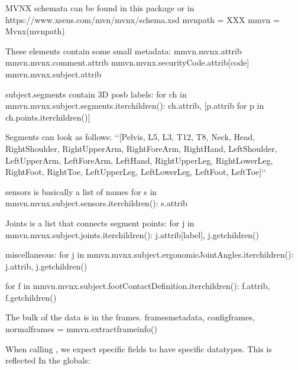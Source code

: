 \documentclass[letterpaper,10pt,english,openany,oneside]{sphinxmanual}
\begin{document}
\begin{sphinxVerbatim}[commandchars=\\\{\}]
\PYGZsh{} MVNX schemata can be found in this package or in
\PYGZsh{} https://www.xsens.com/mvn/mvnx/schema.xsd
mvn\PYGZus{}path = \PYGZdq{}XXX\PYGZdq{}
mmvn = Mvnx(mvn\PYGZus{}path)

\PYGZsh{} These elements contain some small metadata:
mmvn.mvnx.attrib
mmvn.mvnx.comment.attrib
mmvn.mvnx.securityCode.attrib[\PYGZdq{}code\PYGZdq{}]
mmvn.mvnx.subject.attrib

\PYGZsh{} subject.segments contain 3D pos\PYGZus{}b labels:
for ch in mmvn.mvnx.subject.segments.iterchildren():
    ch.attrib, [p.attrib for p in ch.points.iterchildren()]

\PYGZsh{} Segments can look as follows: {}`{}`[\PYGZsq{}Pelvis\PYGZsq{}, \PYGZsq{}L5\PYGZsq{}, \PYGZsq{}L3\PYGZsq{}, \PYGZsq{}T12\PYGZsq{}, \PYGZsq{}T8\PYGZsq{}, \PYGZsq{}Neck\PYGZsq{},
\PYGZsq{}Head\PYGZsq{}, \PYGZsq{}RightShoulder\PYGZsq{}, \PYGZsq{}RightUpperArm\PYGZsq{}, \PYGZsq{}RightForeArm\PYGZsq{}, \PYGZsq{}RightHand\PYGZsq{},
\PYGZsq{}LeftShoulder\PYGZsq{}, \PYGZsq{}LeftUpperArm\PYGZsq{}, \PYGZsq{}LeftForeArm\PYGZsq{}, \PYGZsq{}LeftHand\PYGZsq{}, \PYGZsq{}RightUpperLeg\PYGZsq{},
\PYGZsq{}RightLowerLeg\PYGZsq{}, \PYGZsq{}RightFoot\PYGZsq{}, \PYGZsq{}RightToe\PYGZsq{}, \PYGZsq{}LeftUpperLeg\PYGZsq{}, \PYGZsq{}LeftLowerLeg\PYGZsq{},
\PYGZsq{}LeftFoot\PYGZsq{}, \PYGZsq{}LeftToe\PYGZsq{}]{}`{}`

\PYGZsh{} sensors is basically a list of names
for s in mmvn.mvnx.subject.sensors.iterchildren():
    s.attrib

\PYGZsh{}  Joints is a list that connects segment points:
for j in mmvn.mvnx.subject.joints.iterchildren():
    j.attrib[\PYGZdq{}label\PYGZdq{}], j.getchildren()

\PYGZsh{} miscellaneous:
for j in mmvn.mvnx.subject.ergonomicJointAngles.iterchildren():
    j.attrib, j.getchildren()

for f in mmvn.mvnx.subject.footContactDefinition.iterchildren():
    f.attrib, f.getchildren()

\PYGZsh{} The bulk of the data is in the frames.
frames\PYGZus{}metadata, config\PYGZus{}frames, normal\PYGZus{}frames = mmvn.extract\PYGZus{}frame\PYGZus{}info()
\end{sphinxVerbatim}

When calling , we expect specific fields to have
specific datatypes. This is reflected In the globals:
\end{document}
